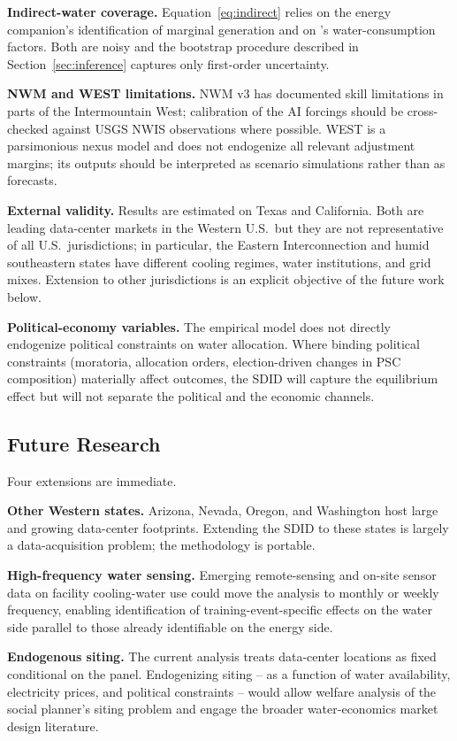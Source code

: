 \documentclass[11pt, letterpaper]{article}
\begin{document}
\textbf{Indirect-water coverage.} Equation~\eqref{eq:indirect} relies on the energy companion's identification of marginal generation and on \citet{jin2019water}'s water-consumption factors. Both are noisy and the bootstrap procedure described in Section~\ref{sec:inference} captures only first-order uncertainty.

\textbf{NWM and WEST limitations.} NWM v3 has documented skill limitations in parts of the Intermountain West; calibration of the AI forcings should be cross-checked against USGS NWIS observations where possible. WEST is a parsimonious nexus model and does not endogenize all relevant adjustment margins; its outputs should be interpreted as scenario simulations rather than as forecasts.

\textbf{External validity.} Results are estimated on Texas and California. Both are leading data-center markets in the Western U.S.\ but they are not representative of all U.S.\ jurisdictions; in particular, the Eastern Interconnection and humid southeastern states have different cooling regimes, water institutions, and grid mixes. Extension to other jurisdictions is an explicit objective of the future work below.

\textbf{Political-economy variables.} The empirical model does not directly endogenize political constraints on water allocation. Where binding political constraints (moratoria, allocation orders, election-driven changes in PSC composition) materially affect outcomes, the SDID will capture the equilibrium effect but will not separate the political and the economic channels.

\subsection{Future Research}
\label{sec:future}

Four extensions are immediate.

\textbf{Other Western states.} Arizona, Nevada, Oregon, and Washington host large and growing data-center footprints. Extending the SDID to these states is largely a data-acquisition problem; the methodology is portable.

\textbf{High-frequency water sensing.} Emerging remote-sensing and on-site sensor data on facility cooling-water use could move the analysis to monthly or weekly frequency, enabling identification of training-event-specific effects on the water side parallel to those already identifiable on the energy side.

\textbf{Endogenous siting.} The current analysis treats data-center locations as fixed conditional on the panel. Endogenizing siting -- as a function of water availability, electricity prices, and political constraints -- would allow welfare analysis of the social planner's siting problem and engage the broader water-economics market design literature.
\end{document}

